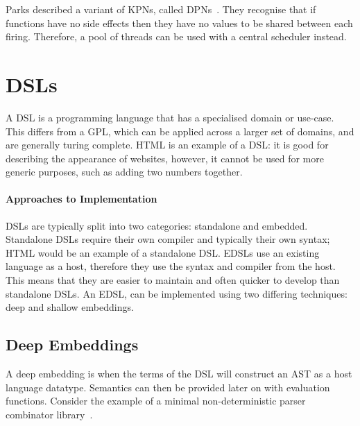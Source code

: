 \documentclass[dissertation.tex]{subfiles}
\newcommand{\Conid}[1]{\mathit{#1}}
\newcommand{\Varid}[1]{\mathit{#1}}
\def\resethooks{%
  \global\let\SaveRestoreHook\empty
  \global\let\ColumnHook\empty}
\newcommand{\hsindent}[1]{\quad}%
\let\hspre\empty
\let\hspost\empty
\providecommand\codeskip{\mskip\codemuskip}%
\let\codefont\textsf
\renewcommand\Varid[1]{\codefont{#1}}
\let\Conid\Varid
\begin{document}
Parks described a variant of \acp{KPN}, called \acp{DPN}~\cite{381846}.
They recognise that if functions have no side effects then they have no values to be shared between each firing.
Therefore, a pool of threads can be used with a central scheduler instead.



\section{\acfp{DSL}}
A \ac{DSL} is a programming language that has a specialised domain or use-case.
This differs from a \ac{GPL}, which can be applied across a larger set of domains, and are generally turing complete.
HTML is an example of a \ac{DSL}: it is good for describing the appearance of websites, however,
it cannot be used for more generic purposes, such as adding two numbers together.

\paragraph{Approaches to Implementation}
DSLs are typically split into two categories: standalone and embedded.
Standalone DSLs require their own compiler and typically their own syntax; HTML would be an example of a standalone \ac{DSL}.
\acp{EDSL} use an existing language as a host, therefore they use the syntax and compiler from the host.
This means that they are easier to maintain and often quicker to develop than standalone \acp{DSL}.
An \ac{EDSL}, can be implemented using two differing techniques: deep and shallow embeddings.



\subsection{Deep Embeddings}
A deep embedding is when the terms of the \ac{DSL} will construct an \ac{AST} as a host language datatype.
Semantics can then be provided later on with evaluation functions.
Consider the example of a minimal non-deterministic parser combinator library~\cite{wuYoda}.


\resethooks
\end{document}
